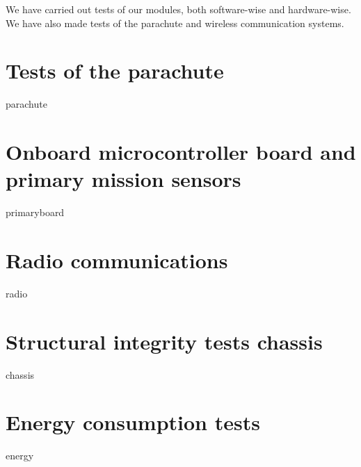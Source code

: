 \documentclass[class=report, crop=false]{standalone}
\begin{document}
We have carried out tests of our modules, both software-wise and hardware-wise. \\
We have also made tests of the parachute and wireless communication systems.
\section{Tests of the parachute}
{parachute}
\section{Onboard microcontroller board and primary mission sensors}
{primaryboard}
\section{Radio communications}
{radio}
\section{Structural integrity tests chassis}
{chassis}
\section{Energy consumption tests}
{energy}
\end{document}
